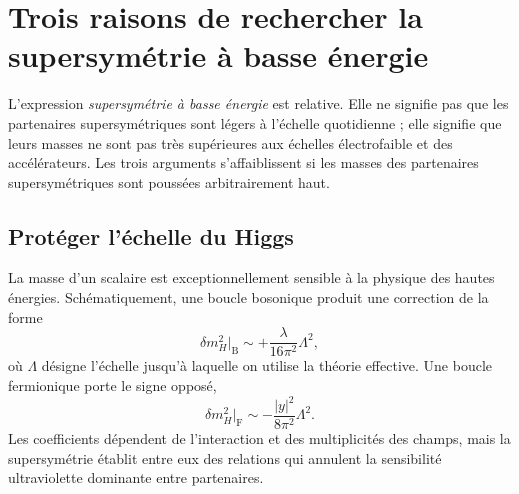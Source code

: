\section{Trois raisons de rechercher la supersymétrie à basse énergie}

\begin{classroomqa}
\end{classroomqa}

L’expression \emph{supersymétrie à basse énergie} est relative. Elle ne signifie pas que les partenaires supersymétriques sont légers à l’échelle quotidienne ; elle signifie que leurs masses ne sont pas très supérieures aux échelles électrofaible et des accélérateurs. Les trois arguments s’affaiblissent si les masses des partenaires supersymétriques sont poussées arbitrairement haut.

\subsection{Protéger l’échelle du Higgs}

La masse d’un scalaire est exceptionnellement sensible à la physique des hautes énergies. Schématiquement, une boucle bosonique produit une correction de la forme
\begin{equation}
\delta m_H^2\big|_{\mathrm B}
\sim +\frac{\lambda}{16\pi^2}\Lambda^2,
\end{equation}
où \(\Lambda\) désigne l’échelle jusqu’à laquelle on utilise la théorie effective. Une boucle fermionique porte le signe opposé,
\begin{equation}
\delta m_H^2\big|_{\mathrm F}
\sim -\frac{|y|^2}{8\pi^2}\Lambda^2.
\end{equation}
Les coefficients dépendent de l’interaction et des multiplicités des champs, mais la supersymétrie établit entre eux des relations qui annulent la sensibilité ultraviolette dominante entre partenaires.

